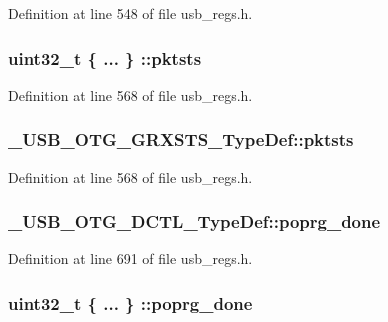 Definition at line 548 of file usb\-\_\-regs.\-h.

\hypertarget{group___u_s_b___o_t_g___d_r_i_v_e_r_ga75fab0b470ce853933ebe408e0385701}{
\subsubsection[{pktsts}]{\setlength{\rightskip}{0pt plus 5cm}uint32\-\_\-t \{ ... \} \-::pktsts}}\label{group___u_s_b___o_t_g___d_r_i_v_e_r_ga75fab0b470ce853933ebe408e0385701}


Definition at line 568 of file usb\-\_\-regs.\-h.

\hypertarget{group___u_s_b___o_t_g___d_r_i_v_e_r_ga686db23028035b8ec903aaedd0f1e3c1}{
\subsubsection[{pktsts}]{ \-\_\-\-U\-S\-B\-\_\-\-O\-T\-G\-\_\-\-G\-R\-X\-S\-T\-S\-\_\-\-Type\-Def\-::pktsts}}\label{group___u_s_b___o_t_g___d_r_i_v_e_r_ga686db23028035b8ec903aaedd0f1e3c1}


Definition at line 568 of file usb\-\_\-regs.\-h.

\hypertarget{group___u_s_b___o_t_g___d_r_i_v_e_r_ga1a3fdc8b6bd4f3d9e43f18c398f8cad9}{
\subsubsection[{poprg\-\_\-done}]{ \-\_\-\-U\-S\-B\-\_\-\-O\-T\-G\-\_\-\-D\-C\-T\-L\-\_\-\-Type\-Def\-::poprg\-\_\-done}}\label{group___u_s_b___o_t_g___d_r_i_v_e_r_ga1a3fdc8b6bd4f3d9e43f18c398f8cad9}


Definition at line 691 of file usb\-\_\-regs.\-h.

\hypertarget{group___u_s_b___o_t_g___d_r_i_v_e_r_ga77c524b8c9db267fac927c8db2c2ca93}{
\subsubsection[{poprg\-\_\-done}]{\setlength{\rightskip}{0pt plus 5cm}uint32\-\_\-t \{ ... \} \-::poprg\-\_\-done}}\label{group___u_s_b___o_t_g___d_r_i_v_e_r_ga77c524b8c9db267fac927c8db2c2ca93}



